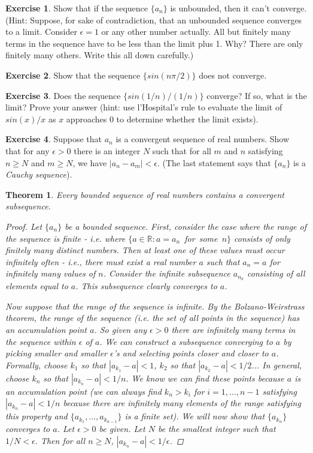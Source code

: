\documentclass[11pt,a4paper]{report}
\theoremstyle{plain}
\newtheorem{thm}{Theorem}[section]
\theoremstyle{definition}
\newtheorem{exercise}{Exercise}[section]
\theoremstyle{remark}
\begin{document}
\begin{exercise} Show that if the sequence $\{a_n\}$ is unbounded, then it can't converge. (Hint: Suppose, for sake of contradiction, that an unbounded sequence converges to a limit. Consider $\epsilon = 1$ or any other number actually. All but finitely many terms in the sequence have to be less than the limit plus 1. Why?  There are only finitely many others.  Write this all down carefully.)
\end{exercise}
\begin{exercise} Show that the sequence $\{sin(n \pi / 2)\}$ does not converge.
\end{exercise}
\begin{exercise}
Does the sequence $\{sin(1/n) / (1/n)\}$ converge?  If so, what is the limit? Prove your answer (hint: use l'Hospital's rule to evaluate the limit of $sin(x) / x$ as $x$ approaches $0$ to determine whether the limit exists).
\end{exercise}
\begin{exercise}
Suppose that ${a_n}$ is a convergent sequence of real numbers.  Show that for any $\epsilon > 0$ there is an integer $N$ such that for all $m$ and $n$ satisfying $n \geq N$ and $m \geq N$, we have $|a_n - a_m|< \epsilon$. (The last statement says that $\{a_n\}$ is a \textit{Cauchy sequence}).
\end{exercise}
\begin{thm}
Every bounded sequence of real numbers contains a convergent subsequence.
\begin{proof}
Let $\{a_n\}$ be a bounded sequence. First, consider the case where the range of the sequence is finite - i.e. where \mbox{$\{a \in \mathbb{R} \colon a = a_n $ for some $n\}$} consists of only finitely many distinct numbers. Then at least one of these values must occur infinitely often - i.e., there must exist a real number $a$ such that $a_n = a$ for infinitely many values of $n$.  Consider the infinite subsequence ${a_{n_k}}$ consisting of all elements equal to $a$.  This subsequence clearly converges to $a$.

Now suppose that the range of the sequence is infinite. By the Bolzano-Weirstrass theorem, the range of the sequence (i.e. the set of all points in the sequence) has an accumulation point $a$. So given any $\epsilon>0$ there are infinitely many terms in the sequence within $\epsilon$ of $a$.  We can construct a subsequence converging to $a$ by picking smaller and smaller $\epsilon$'s and selecting points closer and closer to $a$.  Formally, choose $k_1$ so that $|a_{k_1} - a| < 1$, $k_2$ so that $|a_{k_2} - a| < 1/2$...  In general, choose $k_n$ so that $|a_{k_n} - a| < 1/n$.  We know we can find these points because $a$ is an accumulation point (we can always find $k_n > k_i$ for $i = 1,..., n - 1$ satisfying $|a_{k_n} - a| < 1/n$ because there are infinitely many elements of the range satisfying this property and $\{a_{k_1}, ..., a_{k_{n-1}}\}$ is a finite set).  We will now show that $\{a_{k_n}\}$ converges to $a$.  Let $\epsilon>0$ be given. Let $N$ be the smallest integer such that $1/N < \epsilon$.  Then for all $n \geq N$, $|a_{k_n} - a| < 1/\epsilon$.
\end{proof}
\end{thm}
\end{document}
